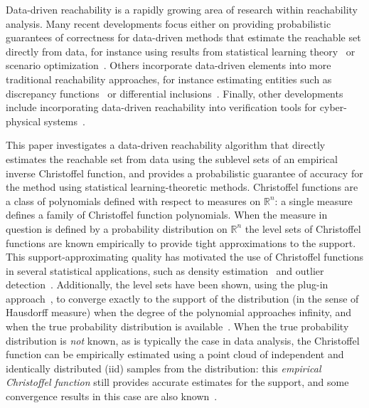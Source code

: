 \documentclass[letterpaper, 10 pt, conference]{ieeeconf}
\newcommand{\R}{\mathbb{R}}
\begin{document}
Data-driven reachability is a rapidly growing area of research within
reachability analysis. Many recent developments focus either on providing probabilistic
guarantees of correctness for data-driven methods that estimate the reachable
set directly from data,
for instance using results from statistical learning theory~\cite{devonport2020data} or scenario
optimization~\cite{marseglia2014hybrid,yang2016multi,ioli2017smart,sartipizadeh2019voronoi,hewing2019scenario,devonport2020estimating}. 
Others incorporate data-driven elements into more traditional reachability
approaches, for instance estimating entities such as discrepancy
functions~\cite{fan2017dryvr} or
differential inclusions~\cite{djeumou2020fly}. Finally, other developments include incorporating
data-driven reachability into verification tools for
cyber-physical systems~\cite{fan2017dryvr, qi2018dryvr}.

This paper investigates a data-driven reachability algorithm that directly
estimates the reachable set from data using the sublevel sets of an empirical
inverse Christoffel function, and provides a probabilistic guarantee of accuracy
for the method using statistical learning-theoretic methods. Christoffel
functions are a class of polynomials defined with respect to measures on $\R^n$:
a single measure defines a family of Christoffel function polynomials.
When the measure in question is defined by a probability distribution on $\R^n$
the level sets of Christoffel functions are known empirically to
provide 
%
tight
approximations to the support.
This support-approximating quality has motivated the use of Christoffel functions in several statistical applications, such as density estimation~\cite{lasserre2017empirical, lasserre2019empirical} and outlier detection~\cite{askari2018kernel}.
Additionally, the level sets have been shown, using the plug-in approach~\cite{cuevas1997plug}, to converge exactly to the support of the distribution (in the sense of
Hausdorff measure) when the degree of the polynomial approaches infinity, and
when the true probability distribution is available~\cite{lasserre2019empirical}.
When the true probability distribution is \emph{not} known, as is typically the case in
data analysis, the Christoffel function can be empirically estimated using a
point cloud of independent and identically distributed (iid) samples from the
distribution: this \emph{empirical Christoffel function} still provides accurate
estimates for the support, and some convergence results in this case are also known~\cite{pauwels2020data}.
\end{document}
